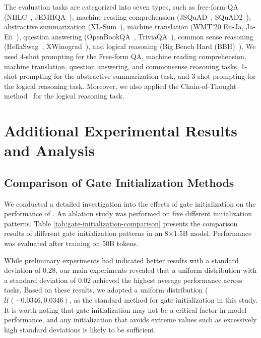 The evaluation tasks are categorized into seven types, such as free-form QA (NIILC~\citep{sekine-etal-2003-niilc}, JEMHQA~\citep{ishi-etal-2023-jemhopqa}), machine reading comprehension (JSQuAD~\citep{kurihara-etal-2022-jglue}, SQuAD2~\citep{DBLP:conf/acl/RajpurkarJL18-squad2}), abstractive summarization (XL-Sum~\citep{hasan-etal-2021-xlsum}), machine translation (WMT'20 En-Ja, Ja-En~\citep{barrault-etal-2020-findings-wmt20}), question answering (OpenBookQA~\citep{mihaylov-etal-2018-openbookqa}, TriviaQA~\citep{joshi-etal-2017-triviaqa}), common sense reasoning (HellaSwag~\citep{zellers-etal-2019-hellaswag}, XWinograd~\citep{DBLP:conf/acl/TikhonovR21-xwino}), and logical reasoning (Big Bench Hard (BBH)~\citep{suzgun-etal-2023-challenging}).
%
We used 4-shot prompting for the Free-form QA, machine reading comprehension, machine translation, question answering, and commonsense reasoning tasks, 
1-shot prompting for the abstractive summarization task, 
and 3-shot prompting for the logical reasoning task. 
Moreover, we also applied the Chain-of-Thought method~\citep{wei2022chain} for the logical reasoning task. 



\section{Additional Experimental Results and Analysis}

\subsection{Comparison of Gate Initialization Methods}\label{appendix:initialization_details}

We conducted a detailed investigation into the effects of gate initialization on the performance of \NUname{}. An ablation study was performed on five different initialization patterns. Table \ref{tab:gate-initialization-comparison} presents the comparison results of different gate initialization patterns in an 8×1.5B model. Performance was evaluated after training on 50B tokens.

While preliminary experiments had indicated better results with a standard deviation of 0.28, our main experiments revealed that a uniform distribution with a standard deviation of 0.02 achieved the highest average performance across tasks. Based on these results, we adopted a uniform distribution ($\mathcal{U}(-0.0346, 0.0346)$, as the standard method for gate initialization in this study.
It is worth noting that gate initialization may not be a critical factor in model performance, and any initialization that avoids extreme values such as excessively high standard deviations is likely to be sufficient. 

